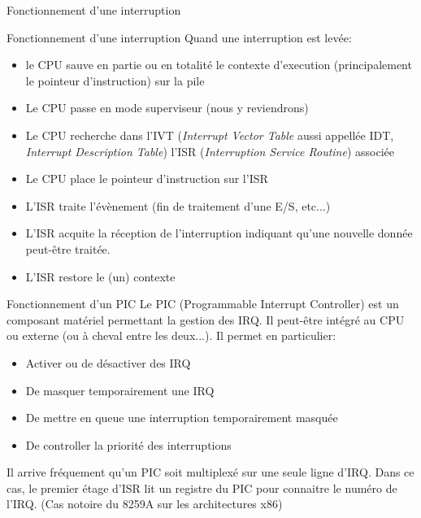 \begin{frame}{Fonctionnement d'une interruption} 
  \begin{center}
  \end{center}
\end{frame}  

\begin{frame}{Fonctionnement d'une interruption}
  Quand une  interruption est levée:
  \begin{itemize} 
  \item le CPU sauve en  partie ou en totalité le contexte d'execution
    (principalement le pointeur d'instruction) sur la pile
  \item Le CPU passe en mode superviseur (nous y reviendrons)
  \item  Le CPU  recherche dans  l'IVT (\emph{Interrupt  Vector Table}
    aussi  appellée  IDT,  \emph{Interrupt  Description  Table})  l'ISR
    (\emph{Interruption Service Routine}) associée
  \item Le CPU place le pointeur d'instruction sur l'ISR
  \item  L'ISR traite  l'évènement (fin  de traitement  d'une E/S,
    etc...)
  \item L'ISR acquite la  réception de l'interruption indiquant qu'une
    nouvelle  donnée peut-être  traitée.
  \item L'ISR restore le (un) contexte
  \end{itemize}
\end{frame}

\begin{frame}{Fonctionnement d'un PIC}
  Le PIC (Programmable Interrupt Controller) est un composant matériel
  permettant  la gestion  des  IRQ.  Il peut-être  intégré  au CPU  ou
  externe (ou à cheval entre les deux...). Il permet en particulier:
  \begin{itemize}
  \item Activer ou de désactiver des IRQ
  \item De masquer temporairement une IRQ
  \item De mettre en queue une interruption temporairement masquée
  \item De controller la priorité des interruptions
  \end{itemize} 
  Il arrive fréquement  qu'un PIC soit multiplexé sur  une seule ligne
  d'IRQ. Dans  ce cas, le premier  étage d'ISR lit un  registre du PIC
  pour connaitre  le numéro de l'IRQ.   (Cas notoire du  8259A sur les
  architectures x86)

\end{frame} 

